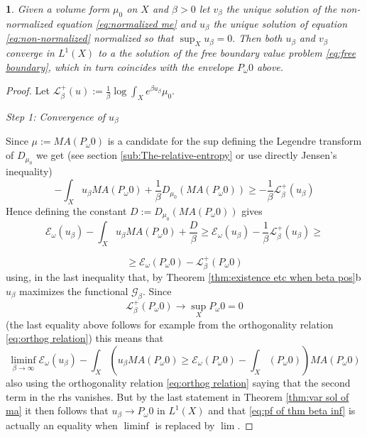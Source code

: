 \documentclass[11pt,oneside,english]{amsart}
\numberwithin{equation}{section}
\numberwithin{figure}{section}
\theoremstyle{plain}
\newtheorem{thm}{\protect\theoremname}[section]
\theoremstyle{plain}
\theoremstyle{plain}
\theoremstyle{plain}
\theoremstyle{remark}
\theoremstyle{definition}
\providecommand{\theoremname}{Theorem}
\begin{document}
\begin{thm}
\label{thm:free bound}Given a volume form $\mu_{0}$ on $X$ and
$\beta>0$ let $v_{\beta}$ the unique solution of the non-normalized
 equation \ref{eq:normalized me} and $u_{\beta}$ the unique solution
of equation \ref{eq:non-normalized} normalized so that $\sup_{X}u_{\beta}=0.$
Then both $u_{\beta}$ and $v_{\beta}$ converge in $L^{1}(X)$ to
a the solution of the free boundary value problem \ref{eq:free boundary},
which in turn coincides with the envelope $P_{\omega}0$ above. \end{thm}
\begin{proof}
Let $\mathcal{L}_{\beta}^{+}(u):=\frac{1}{\beta}\log\int_{X}e^{\beta u_{\beta}}\mu_{0}.$

\emph{Step 1: Convergence of $u_{\beta}$}

Since $\mu:=MA(P_{\omega}0)$ is a candidate for the sup defining
the Legendre transform of $D_{\mu_{0}}$ we get (see section \ref{sub:The-relative-entropy}
or use directly Jensen's inequality) 
\[
-\int_{X}u_{\beta}MA(P_{\omega}0)+\frac{1}{\beta}D_{\mu_{0}}(MA(P_{\omega}0))\geq-\frac{1}{\beta}\mathcal{L}_{\beta}^{+}(u_{\beta})
\]
 Hence defining the constant $D:=D_{\mu_{0}}(MA(P_{\omega}0))$ gives
\begin{equation}
\mathcal{E_{\omega}}(u_{\beta})-\int_{X}u_{\beta}MA(P_{\omega}0)+\frac{D}{\beta}\geq\mathcal{E_{\omega}}(u_{\beta})-\frac{1}{\beta}\mathcal{L}_{\beta}^{+}(u_{\beta})\geq\label{eq:pf of thm beta inf ineq}
\end{equation}
 
\[
\geq\mathcal{E_{\omega}}(P_{\omega}0)-\mathcal{L}_{\beta}^{+}(P_{\omega}0)
\]
 using, in the last inequality that, by Theorem \ref{thm:existence etc when beta pos}b
$u_{\beta}$ maximizes the functional $\mathcal{G}_{\beta}.$ Since
\[
\mathcal{L}_{\beta}^{+}(P_{\omega}0)\rightarrow\sup_{X}P_{\omega}0=0
\]
 (the last equality above follows for example from the orthogonality
relation \ref{eq:orthog relation}) this means that 
\begin{equation}
\liminf_{\beta\rightarrow\infty}\mathcal{E_{\omega}}(u_{\beta})-\int_{X}(u_{\beta}MA(P_{\omega}0)\geq\mathcal{E_{\omega}}(P_{\omega}0)-\int_{X}(P_{\omega}0))MA(P_{\omega}0)\label{eq:pf of thm beta inf}
\end{equation}
 also using the orthogonality relation \ref{eq:orthog relation} saying
that the second term in the rhs vanishes. But by the last statement
in Theorem \ref{thm:var sol of ma} it then follows that $u_{\beta}\rightarrow P_{\omega}0$
in $L^{1}(X)$ and that \ref{eq:pf of thm beta inf} is actually an
equality when $\liminf$ is replaced by $\lim.$


\end{proof}
\end{document}
